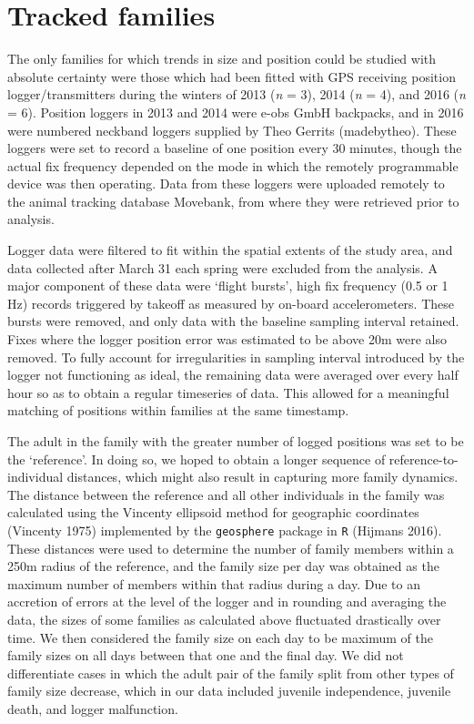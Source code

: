 \documentclass[twocolumn]{article}
\begin{document}
\section{Tracked families}\label{tracked-families}

The only families for which trends in size and position could be studied
with absolute certainty were those which had been fitted with GPS
receiving position logger/transmitters during the winters of 2013
(\emph{n} = 3), 2014 (\emph{n} = 4), and 2016 (\emph{n} = 6). Position
loggers in 2013 and 2014 were e-obs GmbH backpacks, and in 2016 were
numbered neckband loggers supplied by Theo Gerrits (madebytheo). These
loggers were set to record a baseline of one position every 30 minutes,
though the actual fix frequency depended on the mode in which the
remotely programmable device was then operating. Data from these loggers
were uploaded remotely to the animal tracking database Movebank, from
where they were retrieved prior to analysis.

Logger data were filtered to fit within the spatial extents of the study
area, and data collected after March 31 each spring were excluded from
the analysis. A major component of these data were `flight bursts', high
fix frequency (0.5 or 1 Hz) records triggered by takeoff as measured by
on-board accelerometers. These bursts were removed, and only data with
the baseline sampling interval retained. Fixes where the logger position
error was estimated to be above 20m were also removed. To fully account
for irregularities in sampling interval introduced by the logger not
functioning as ideal, the remaining data were averaged over every half
hour so as to obtain a regular timeseries of data. This allowed for a
meaningful matching of positions within families at the same timestamp.

The adult in the family with the greater number of logged positions was
set to be the `reference'. In doing so, we hoped to obtain a longer
sequence of reference-to-individual distances, which might also result
in capturing more family dynamics. The distance between the reference
and all other individuals in the family was calculated using the
Vincenty ellipsoid method for geographic coordinates (Vincenty 1975)
implemented by the \texttt{geosphere} package in \texttt{R} (Hijmans
2016). These distances were used to determine the number of family
members within a 250m radius of the reference, and the family size per
day was obtained as the maximum number of members within that radius
during a day. Due to an accretion of errors at the level of the logger
and in rounding and averaging the data, the sizes of some families as
calculated above fluctuated drastically over time. We then considered
the family size on each day to be maximum of the family sizes on all
days between that one and the final day. We did not differentiate cases
in which the adult pair of the family split from other types of family
size decrease, which in our data included juvenile independence,
juvenile death, and logger malfunction.
\end{document}
